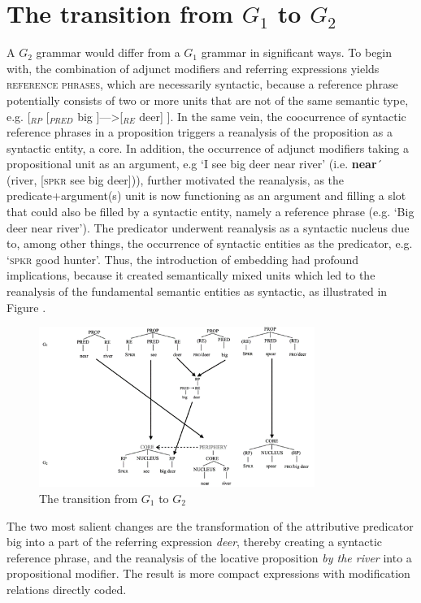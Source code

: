 \documentclass[output=paper,colorlinks,citecolor=brown]{langscibook}
\begin{document}
\section{The transition from $G_1$ to $G_2$}\label{sec:vanvalin:5}

A $G_2$ grammar would differ from a $G_1$ grammar in significant ways.  To begin with, the combination of adjunct modifiers and referring expressions yields \textsc{reference phrases}, which are necessarily syntactic, because a reference phrase potentially consists of two or more units that are not of the same semantic type, e.g. [$_{RP}$ [$_{PRED}$ big ]—>[$_{RE}$ deer] ].  In the same vein, the coocurrence of syntactic reference phrases in a proposition triggers a reanalysis of the proposition as a syntactic entity, a core.  In addition, the occurrence of adjunct modifiers taking a propositional unit as an argument, e.g ‘I see big deer near river’ (i.e. \textbf{near}´ (river, [\textsc{spkr} see big deer])), further motivated the reanalysis, as the predicate+argument(s) unit is now functioning as an argument and filling a slot that could also be filled by a syntactic entity, namely a reference phrase (e.g. ‘Big deer near river’).  The predicator underwent reanalysis as a syntactic nucleus due to, among other things, the occurrence of syntactic entities as the predicator, e.g. ‘\textsc{spkr} good hunter’.  Thus, the introduction of embedding had profound implications, because it created semantically mixed units which led to the reanalysis of the fundamental semantic entities as syntactic, as illustrated in Figure .

\begin{figure}
\centering
\includegraphics[width=0.8\textwidth]{vanvalin_figure3.png}
\caption{\label{fig:fig3}The transition from $G_1$ to $G_2$}
\end{figure}

The two most salient changes are the transformation of the attributive predicator big into a part of the referring expression \emph{deer}, thereby creating a syntactic reference phrase, and the reanalysis of the locative proposition \emph{by the river} into a propositional modifier.  The result is more compact expressions with modification relations directly coded.  
\end{document}
